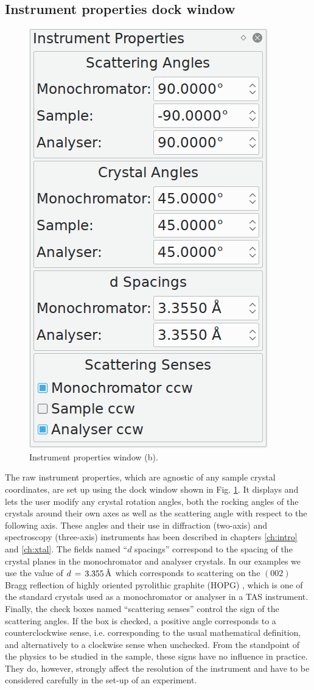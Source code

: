 \subsection{Instrument properties dock window}
\begin{minipage}{1 \textwidth}
\setlength{\intextsep}{0.25cm}
\begin{figure}
	\vspace{-0.25cm}
	\includegraphics[width = 0.25 \textwidth]{figures/gui_instrument}
	\caption[Instrument properties window.]{Instrument properties window (b).
		\label{fig:gui_instr}}
\end{figure}

The raw instrument properties, which are agnostic of any sample crystal coordinates, are set up
using the dock window shown in Fig. \ref{fig:gui_instr}. It displays and lets the user modify
any crystal rotation angles, both the rocking angles of the crystals around their own axes
as well as the scattering angle with respect to the following axis. These angles and their
use in diffraction (two-axis) and spectroscopy (three-axis) instruments has been described 
in chapters \ref{ch:intro} and \ref{ch:xtal}. 
The fields named ``$d$ spacings'' correspond to the spacing of the crystal planes in the 
monochromator and analyser crystals. In our examples we use the value of $d\,=\,3.355\, \textup{\AA}$
which corresponds to scattering on the $\left(002\right)$ Bragg reflection of highly oriented
pyrolithic graphite (HOPG) \cite[p. 250]{Shirane2002}, which is one of the standard crystals used as a
monochromator or analyser in a TAS instrument.
Finally, the check boxes named ``scattering senses'' control the sign of the scattering angles.
If the box is checked, a positive angle corresponds to a counterclockwise sense, i.e. corresponding
to the usual mathematical definition, and alternatively to a clockwise sense when unchecked.
From the standpoint of the physics to be studied in the sample, these signs have no influence
in practice. They do, however, strongly affect the resolution of the instrument \cite{Eckold2014} \cite[p. 260]{Shirane2002}
and have to be considered carefully in the set-up of an experiment.
\end{minipage}



